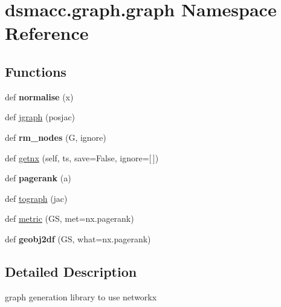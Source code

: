 \hypertarget{namespacedsmacc_1_1graph_1_1graph}{}\section{dsmacc.\+graph.\+graph Namespace Reference}
\label{namespacedsmacc_1_1graph_1_1graph}
\subsection*{Functions}
\begin{DoxyCompactItemize}
\item 
\mbox{\label{namespacedsmacc_1_1graph_1_1graph_a936253bffd65ad8d19a579f5f1f6928d}} 
def {\bfseries normalise} (x)
\item 
def \mbox{\hyperlink{namespacedsmacc_1_1graph_1_1graph_a63af59bfa3dc885cc6d4f1ac1e79ac0f}{jgraph}} (posjac)
\item 
\mbox{\label{namespacedsmacc_1_1graph_1_1graph_aedbc1be59c07dbc546f749f1cf1ca6f7}} 
def {\bfseries rm\+\_\+nodes} (G, ignore)
\item 
def \mbox{\hyperlink{namespacedsmacc_1_1graph_1_1graph_a92150b89f1671886a95899c7f6a1b139}{getnx}} (self, ts, save=False, ignore=\mbox{[}$\,$\mbox{]})
\item 
\mbox{\label{namespacedsmacc_1_1graph_1_1graph_a175256816c6dbcbff6cdfff8e38eaf24}} 
def {\bfseries pagerank} (a)
\item 
def \mbox{\hyperlink{namespacedsmacc_1_1graph_1_1graph_af1100c886b7f48a0287ba1fe0accc785}{tograph}} (jac)
\item 
def \mbox{\hyperlink{namespacedsmacc_1_1graph_1_1graph_addafb8b938b7dc46ee5f4e87b0dc0ebe}{metric}} (GS, met=\textquotesingle{}nx.\+pagerank\textquotesingle{})
\item 
\mbox{\label{namespacedsmacc_1_1graph_1_1graph_a07f7e22ebaffb85b3ad1c87dae258198}} 
def {\bfseries geobj2df} (GS, what=\textquotesingle{}nx.\+pagerank\textquotesingle{})
\end{DoxyCompactItemize}


\subsection{Detailed Description}
\begin{DoxyVerb}graph generation library to use networkx
\end{DoxyVerb}
 

